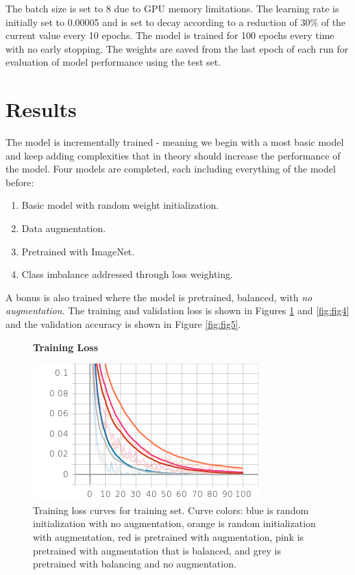 \documentclass[10pt,twocolumn,letterpaper]{article}
\begin{document}
The batch size is set to 8 due to GPU memory limitations. The learning rate is initially set to 0.00005 and is set to decay according to a reduction of 30\% of the current value every 10 epochs. The model is trained for 100 epochs every time with no early stopping. The weights are saved from the last epoch of each run for evaluation of model performance using the test set.

\section{Results}

The model is incrementally trained - meaning we begin with a most basic model and keep adding complexities that in theory should increase the performance of the model. Four models are completed, each including everything of the model before:
\begin{enumerate}
   \item Basic model with random weight initialization.
   \item Data augmentation.
   \item Pretrained with ImageNet.
   \item Class imbalance addressed through loss weighting.
\end{enumerate}

A bonus is also trained where the model is pretrained, balanced, with \emph{no augmentation}. The training and validation loss is shown in Figures \ref{fig:fig3} and \ref{fig:fig4} and the validation accuracy is shown in Figure \ref{fig:fig5}.

\begin{figure}[h]
   \begin{center}
      \textbf{Training Loss}\par\medskip
      \includegraphics[width=0.95\linewidth]{images/loss-training.png}
   \end{center}
   \caption{Training loss curves for training set. Curve colors: blue is random initialization with no augmentation, orange is random initialization with augmentation, red is pretrained with augmentation, pink is pretrained with augmentation that is balanced, and grey is pretrained with balancing and no augmentation.}
\label{fig:fig3}
\end{figure}
\end{document}

